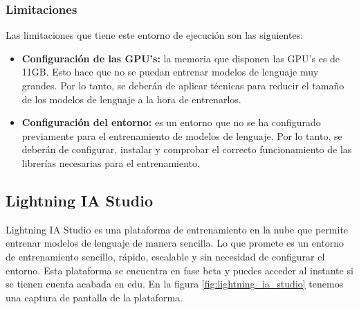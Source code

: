 \subsubsection{Limitaciones}
\label{subsubsec:limitaciones}


Las limitaciones que tiene este entorno de ejecución son las siguientes:

\begin{itemize}
    \item \textbf{Configuración de las GPU's:} la memoria que disponen las GPU's es de 11GB.
        Esto hace que no se puedan entrenar modelos de lenguaje muy grandes. Por lo tanto,
        se deberán de aplicar técnicas para reducir el tamaño de los modelos de lenguaje a la
        hora de entrenarlos.
    \item \textbf{Configuración del entorno:} es un entorno que no se ha configurado previamente
        para el entrenamiento de modelos de lenguaje. Por lo tanto, se deberán de configurar, instalar
        y comprobar el correcto funcionamiento de las librerías necesarias para el entrenamiento.
\end{itemize}

\subsection{Lightning IA Studio}
\label{subsec:lightning_ia_studio}


Lightning IA Studio es una plataforma de entrenamiento en la nube que permite entrenar
modelos de lenguaje de manera sencilla. Lo que promete es un entorno de entrenamiento
sencillo, rápido, escalable y sin necesidad de configurar el entorno. Esta plataforma
se encuentra en fase beta y puedes acceder al instante si se tienen cuenta acabada en
edu. En la figura \ref{fig:lightning_ia_studio} tenemos una captura de pantalla de la
plataforma.

